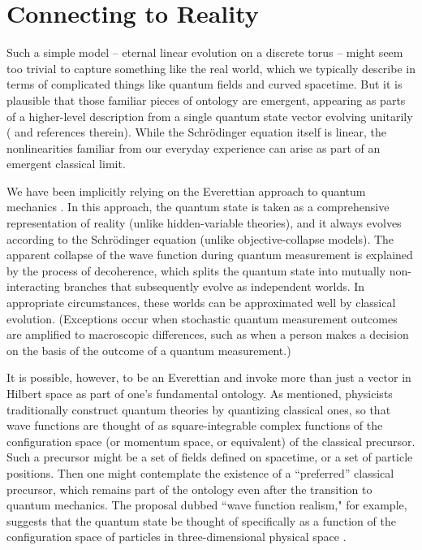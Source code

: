 \documentclass[aps,prd,twocolumn,nofootinbib,notitlepage]{revtex4-1}
\begin{document}
\section{Connecting to Reality}

Such a simple model -- eternal linear evolution on a discrete torus -- might seem too trivial to capture something like the real world, which we typically describe in terms of complicated things like quantum fields and curved spacetime. 
But it is plausible that those familiar pieces of ontology are emergent, appearing as parts of a higher-level description from a single quantum state vector evolving unitarily (\cite{Carroll:2018rhc,Carroll2021} and references therein). 
While the Schr\"odinger equation itself is linear, the nonlinearities familiar from our everyday experience can arise as part of an emergent classical limit.

We have been implicitly relying on the Everettian approach to quantum mechanics \cite{wallace2012emergent}.
In this approach, the quantum state is taken as a comprehensive representation of reality (unlike hidden-variable theories), and it always evolves according to the Schr\"odinger equation (unlike objective-collapse models).
The apparent collapse of the wave function during quantum measurement is explained by the process of decoherence, which splits the quantum state into mutually non-interacting branches that subsequently evolve as independent worlds.
In appropriate circumstances, these worlds can be approximated well by classical evolution.
(Exceptions occur when stochastic quantum measurement outcomes are amplified to macroscopic differences, such as when a person makes a decision on the basis of the outcome of a quantum measurement.)

It is possible, however, to be an Everettian and invoke more than just a vector in Hilbert space as part of one's fundamental ontology. 
As mentioned, physicists traditionally construct quantum theories by quantizing classical ones, so that wave functions are thought of as square-integrable complex functions of the configuration space (or momentum space, or equivalent) of the classical precursor.
Such a precursor might be a set of fields defined on spacetime, or a set of particle positions.
Then one might contemplate the existence of a ``preferred'' classical precursor, which remains part of the ontology even after the transition to quantum mechanics.
The proposal dubbed ``wave function realism," for example, suggests that the quantum state be thought of specifically as a function of the configuration space of particles in three-dimensional physical space \cite{Albert1996-ALBEQM}.
\end{document}
